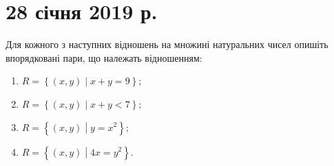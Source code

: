 





\section*{28 січня 2019 р.}

\begin{problem}
	Для кожного з наступних відношень на множині натуральних чисел опишіть впорядковані пари, що належать відношенням:
	\begin{enumerate}
		\item $R = \left\{ \left( x, y \right) \middle| x + y = 9 \right\}$;
		\item $R = \left\{ \left( x, y \right) \middle| x + y < 7 \right\}$;
		\item $R = \left\{ \left( x, y \right) \middle| y = x^2 \right\}$;
		\item $R = \left\{ \left( x, y \right) \middle| 4 x = y^2 \right\}$.
	\end{enumerate}
\end{problem}

